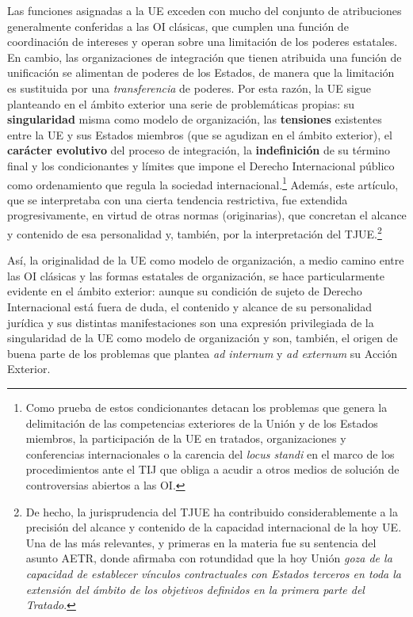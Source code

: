 \documentclass[10pt,a4paper]{article}
\begin{document}
Las funciones asignadas a la UE exceden con mucho del conjunto de atribuciones generalmente conferidas a las OI clásicas, que cumplen una función de coordinación de intereses y operan sobre una limitación de los poderes estatales. En cambio, las organizaciones de integración que tienen atribuida una función de unificación se alimentan de poderes de los Estados, de manera que la limitación es sustituida por una \textit{transferencia} de poderes. Por esta razón, la UE sigue planteando en el ámbito exterior una serie de problemáticas propias: su \textbf{singularidad} misma como modelo de organización, las \textbf{tensiones} existentes entre la UE y sus Estados miembros (que se agudizan en el ámbito exterior), el \textbf{carácter evolutivo} del proceso de integración, la \textbf{indefinición} de su término final y los condicionantes y límites que impone el Derecho Internacional público como ordenamiento que regula la sociedad internacional.\footnote{%
    Como prueba de estos condicionantes detacan los problemas que genera la delimitación de las competencias exteriores de la Unión y de los Estados miembros, la participación de la UE en tratados, organizaciones y conferencias internacionales o la carencia del \textit{locus standi} en el marco de los procedimientos ante el TIJ que obliga a acudir a otros medios de solución de controversias abiertos a las OI.
} Además, este artículo, que se interpretaba con una cierta tendencia restrictiva, fue extendida progresivamente, en virtud de otras normas (originarias), que concretan el alcance y contenido de esa personalidad y, también, por la interpretación del TJUE.\footnote{%
    De hecho, la jurisprudencia del TJUE ha contribuido considerablemente a la precisión del alcance y contenido de la capacidad internacional de la hoy UE. Una de las más relevantes, y primeras en la materia fue su sentencia del asunto AETR, donde afirmaba con rotundidad que la hoy Unión \textit{goza de la capacidad de establecer vínculos contractuales con Estados terceros en toda la extensión del ámbito de los objetivos definidos en la primera parte del Tratado}.
}

Así, la originalidad de la UE como modelo de organización, a medio camino entre las OI clásicas y las formas estatales de organización, se hace particularmente evidente en el ámbito exterior: aunque su condición de sujeto de Derecho Internacional está fuera de duda, el contenido y alcance de su personalidad jurídica y sus distintas manifestaciones son una expresión privilegiada de la singularidad de la UE como modelo de organización y son, también, el origen de buena parte de los problemas que plantea \textit{ad internum} y \textit{ad externum} su Acción Exterior. 
\end{document}
